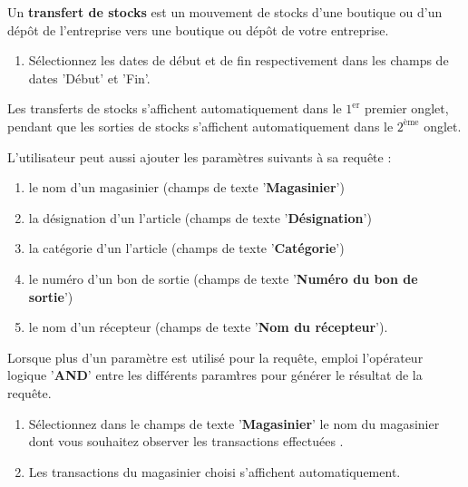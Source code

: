 Un \textbf{transfert de stocks} est un mouvement de stocks
d'une boutique ou d'un d\'ep\^ot de l'entreprise vers une
boutique ou d\'ep\^ot de votre entreprise.



\begin{enumerate}[1)]
	\item S\'electionnez les dates de d\'ebut et de
	fin respectivement dans les champs de dates
	'D\'ebut' et 'Fin'.
\end{enumerate}

Les transferts de stocks s'affichent automatiquement
dans le $1^{\text{er}}$ premier onglet, pendant que
les sorties de stocks s'affichent automatiquement
dans le $2^{\text{\`eme}}$ onglet.	

L'utilisateur peut aussi ajouter les param\`etres suivants
\`a sa requ\^ete :

\begin{enumerate}[1)]
	\item le nom d'un magasinier (champs de texte 
	'\textbf{Magasinier}')
	\item la d\'esignation d'un l'article 
		(champs de texte '\textbf{D\'esignation}')
	\item la cat\'egorie d'un l'article 
		(champs de texte '\textbf{Cat\'egorie}')
	\item le num\'ero d'un bon de sortie 
		(champs de texte '\textbf{Num\'ero du bon de sortie}')
	\item le nom d'un r\'ecepteur
		(champs de texte '\textbf{Nom du r\'ecepteur}').
\end{enumerate}

Lorsque plus d'un param\`etre est utilis\'e pour
la requ\^ete, \yeroth emploi l'op\'erateur logique
'\textbf{AND}' entre les diff\'erents param\`tres
pour g\'en\'erer le r\'esultat de la requ\^ete.



\begin{enumerate}[1)]
	\item S\'electionnez dans le champs de texte
	'\textbf{Magasinier}' le nom du magasinier dont
	vous souhaitez observer les transactions effectu\'ees .
	
	\item Les transactions du magasinier choisi
	s'affichent automatiquement.
\end{enumerate}


